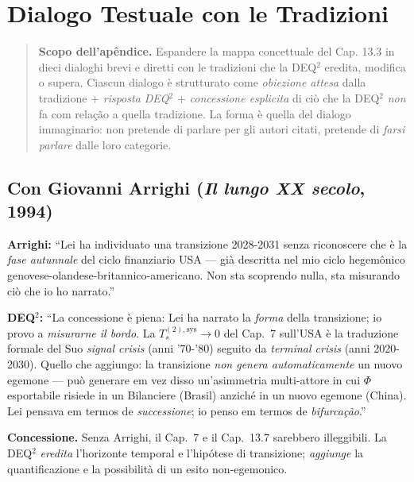 \chapter{Dialogo Testuale con le
Tradizioni}\label{dialogo-testuale-con-le-tradizioni}

\begin{quote}
\textbf{Scopo dell'apêndice.} Espandere la mappa concettuale del Cap.
13.3 in dieci dialoghi brevi e diretti con le tradizioni che la DEQ$^2$
eredita, modifica o supera. Ciascun dialogo è strutturato come
\emph{obiezione attesa} dalla tradizione + \emph{risposta DEQ$^2$} +
\emph{concessione esplicita} di ciò che la DEQ$^2$ \emph{non} fa com relação a
quella tradizione. La forma è quella del dialogo immaginario: non
pretende di parlare per gli autori citati, pretende di \emph{farsi
parlare} dalle loro categorie.
\end{quote}



\section{\texorpdfstring{Con Giovanni Arrighi (\emph{Il lungo XX
secolo},
1994)}{Con Giovanni Arrighi (Il lungo XX secolo, 1994)}}\label{con-giovanni-arrighi-il-lungo-xx-secolo-1994}

\textbf{Arrighi:} ``Lei ha individuato una transizione 2028-2031 senza
riconoscere che è la \emph{fase autunnale} del ciclo finanziario USA ---
già descritta nel mio ciclo hegemônico
genovese-olandese-britannico-americano. Non sta scoprendo nulla, sta
misurando ciò che io ho narrato.''

\textbf{DEQ$^2$:} ``La concessione è piena: Lei ha narrato la \emph{forma}
della transizione; io provo a \emph{misurarne il bordo}. La
\(T_s^{(2),\text{sys}} \to 0\) del Cap.~7 sull'USA è la traduzione
formale del Suo \emph{signal crisis} (anni '70-'80) seguito da
\emph{terminal crisis} (anni 2020-2030). Quello che aggiungo: la
transizione \emph{non genera automaticamente} un nuovo egemone --- può
generare em vez disso un'asimmetria multi-attore in cui \(\Phi\) esportabile
risiede in un Bilanciere (Brasil) anziché in un nuovo egemone (China).
Lei pensava em termos de \emph{successione}; io penso em termos de
\emph{bifurcação}.''

\textbf{Concessione.} Senza Arrighi, il Cap.~7 e il Cap.~13.7 sarebbero
illeggibili. La DEQ$^2$ \emph{eredita} l'horizonte temporal e l'hipótese di
transizione; \emph{aggiunge} la quantificazione e la possibilità di un
esito non-egemonico.



